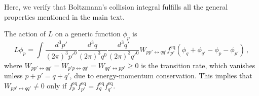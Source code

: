 \documentclass[a4paper, amsfonts, amssymb, amsmath, reprint, showkeys, nofootinbib, twoside, onecolumn,notitlepage,,longbibliography]{revtex4-2}
\theoremstyle{definition}
\theoremstyle{theorem}
\theoremstyle{corollary}
\begin{document}
Here, we verify that Boltzmann's collision integral fulfills all the general properties mentioned in the main text. 

The action of $L$ on a generic function $\phi_p$ is
\begin{equation}\label{gargarensis}
    L\phi_p = \int \dfrac{d^3p'}{(2\pi)^3p'^0} \dfrac{d^3q}{(2\pi)^3q^0} \dfrac{d^3q'}{(2\pi)^3q'^0} W_{pp'\leftrightarrow qq'} f^{\text{eq}}_{p'}(\phi_q{+}\phi_{q'}{-}\phi_p{-}\phi_{p'}) \, ,
\end{equation}
where $W_{pp'\leftrightarrow qq'}=W_{p'p\leftrightarrow qq'}=W_{qq'\leftrightarrow pp'} \geq 0$ is the transition rate, which vanishes unless $p{+}p'=q{+}q'$, due to energy-momentum conservation. This implies that $W_{pp'\leftrightarrow qq'} \neq 0$ only if $f^{\text{eq}}_{p} f^{\text{eq}}_{p'}=f^{\text{eq}}_{q} f^{\text{eq}}_{q'}$. 
\end{document}
